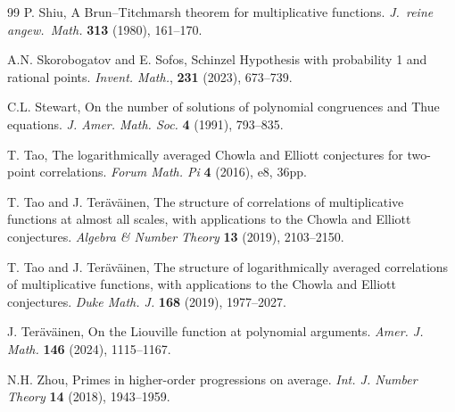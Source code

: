 \documentclass[11pt,letterpaper]{amsart}
\theoremstyle{definition}
\numberwithin{equation}{section}
\newcommand{\0}{\mathbf{0}}
\begin{document}
\begin{thebibliography}{99}
P. Shiu, A {B}run--{T}itchmarsh theorem for multiplicative functions.
{\em J.\ reine angew.\ Math.}  {\bf 313} (1980), 161--170.

A.N. Skorobogatov and E. Sofos,
Schinzel Hypothesis with probability 1 and rational points. {\em Invent. Math.}, {\bf 231} (2023), 673--739.

C.L. Stewart, On the number of solutions of polynomial congruences and Thue equations. {\em  J.
Amer. Math. Soc.} {\bf 4}  (1991), 793--835.

T. Tao, The logarithmically averaged {C}howla and {E}lliott
              conjectures for two-point correlations.
{\em Forum Math. Pi} {\bf 4} (2016), e8, 36pp.

T. Tao and J. Ter{\"a}v{\"a}inen, 
The structure of correlations of multiplicative functions at almost all scales, with applications to the Chowla and Elliott conjectures. {\em Algebra \& Number Theory} {\bf 13} (2019), 2103--2150. 


T. Tao and J. Ter{\"a}v{\"a}inen, 
The structure of logarithmically averaged correlations of multiplicative functions, with applications to the {C}howla and {E}lliott conjectures. {\em Duke Math. J.} {\bf 168} (2019), 
1977--2027.


J. Ter{\"a}v{\"a}inen, 
On the Liouville function at polynomial arguments. {\em Amer. J. Math.} {\bf 146} (2024), 1115--1167.

N.H. Zhou, 
Primes in higher-order progressions on average. 
{\em Int. J. Number Theory} {\bf 14} (2018), 1943--1959.


\end{thebibliography}
\end{document}
